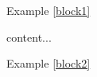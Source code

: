 \documentclass[12pt,xcolor=dvipsnames]{beamer}
\newcounter{block}
\numberwithin{block}{section}
\begin{document}
\section{}
\begin{frame}{Example \ref{block1}}
\begin{block}{}\label{block1}
\lipsum[2]
\end{block}
\end{frame}

\begin{frame}
content...
\end{frame}

\begin{frame}{Example \ref{block2}}
\begin{block}{}\label{block2}
\lipsum[2]
\end{block}
\end{frame}
\end{document}
